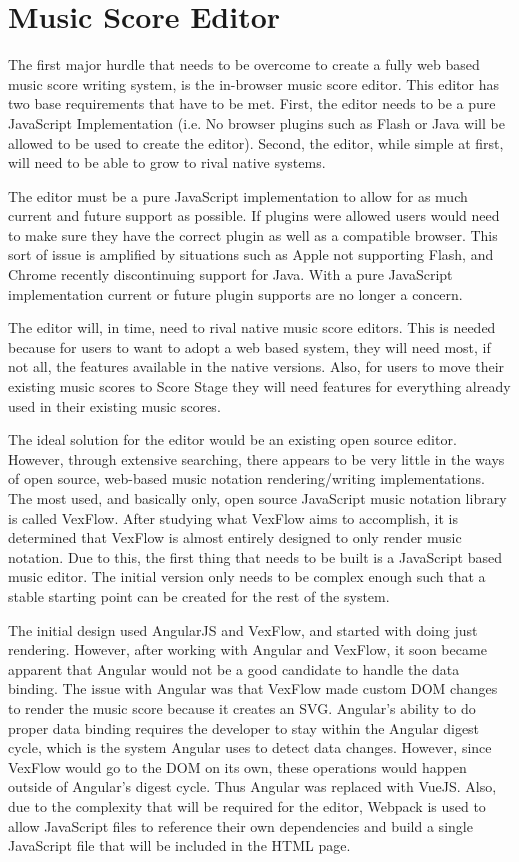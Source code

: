 \documentclass[letterpaper,12pt]{article}
\begin{document}
\section{Music Score Editor}

The first major hurdle that needs to be overcome to create a fully web based music score writing system, is the
in-browser music score editor. This editor has two base requirements that have to be met. First, the editor
needs to be a pure JavaScript Implementation (i.e. No browser plugins such as Flash or Java will be allowed to be used
to create the editor). Second, the editor, while simple at first, will need to be able to grow to rival native systems.

The editor must be a pure JavaScript implementation to allow for as much current and future support as possible. If
plugins were allowed users would need to make sure they have the correct plugin as well as a compatible browser.
This sort of issue is amplified by situations such as Apple not supporting Flash, and Chrome recently discontinuing
support for Java. With a pure JavaScript implementation current or future plugin supports are no longer a concern.

The editor will, in time, need to rival native music score editors. This is needed because for users to want to adopt
a web based system, they will need most, if not all, the features available in the native versions. Also, for users to
move their existing music scores to Score Stage they will need features for everything already used in their existing
music scores.

The ideal solution for the editor would be an existing open source editor. However, through extensive searching, there
appears to be very little in the ways of open source, web-based music notation rendering/writing implementations. The
most used, and basically only, open source JavaScript music notation library is called VexFlow. After studying what
VexFlow aims to accomplish, it is determined that VexFlow is almost entirely designed to only render music notation. Due
to this, the first thing that needs to be built is a JavaScript based music editor. The initial version only needs to be
complex enough such that a stable starting point can be created for the rest of the system.

The initial design used AngularJS and VexFlow, and started with doing just rendering. However, after working with
Angular and VexFlow, it soon became apparent that Angular would not be a good candidate to handle the data binding. The
issue with Angular was that VexFlow made custom DOM changes to render the music score because it creates an SVG.
Angular's ability to do proper data binding requires the developer to stay within the Angular digest cycle, which is the
system Angular uses to detect data changes. However, since VexFlow would go to the DOM on its own, these operations
would happen outside of Angular's digest cycle. Thus Angular was replaced with VueJS. Also, due to the complexity that
will be required for the editor, Webpack is used to allow JavaScript files to reference their own dependencies and build
a single JavaScript file that will be included in the HTML page.
\end{document}
